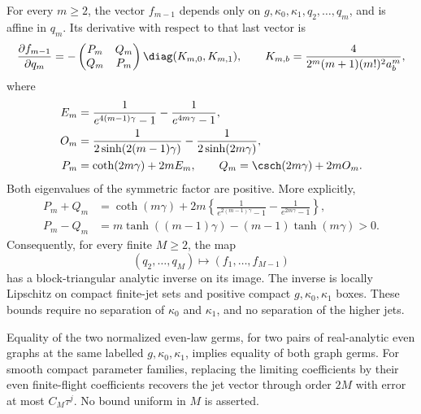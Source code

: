 \begin{theorem}
\label{thm:v12-two-contact}
For every $m\ge2$, the vector $f_{m-1}$ depends only on
$g,\kappa_0,\kappa_1,q_2,\ldots,q_m$, and is affine in $q_m$.
Its derivative with respect to that last vector is
\begin{equation}\label{eq:v12-block}
 \frac{\partial f_{m-1}}{\partial q_m}
 =-\begin{pmatrix}P_m&Q_m\\Q_m&P_m\end{pmatrix}
              \diag(K_{m,0},K_{m,1}),\qquad
 K_{m,b}=\frac{4}{2^m(m+1)(m!)^2a_b^m},
\end{equation}
where
\begin{align}
 E_m&=\frac1{e^{4(m-1)\gamma}-1}
                         -\frac1{e^{4m\gamma}-1},\notag\\
 O_m&=\frac1{2\sinh(2(m-1)\gamma)}
                         -\frac1{2\sinh(2m\gamma)},\notag\\
 P_m&=\coth(2m\gamma)+2mE_m,\qquad
 Q_m=\csch(2m\gamma)+2mO_m.\label{eq:v12-PQ}
\end{align}
Both eigenvalues of the symmetric factor are positive. More explicitly,
\begin{align}
 P_m+Q_m
 &=\coth(m\gamma)+2m\left\{
       \frac1{e^{2(m-1)\gamma}-1}-\frac1{e^{2m\gamma}-1}\right\},
                                      \label{eq:v12-plus}\\
 P_m-Q_m
 &=m\tanh((m-1)\gamma)-(m-1)\tanh(m\gamma)>0.
                                      \label{eq:v12-minus}
\end{align}
Consequently, for every finite $M\ge2$, the map
\begin{equation}\label{eq:v12-jet-map}
 (q_2,\ldots,q_M)\longmapsto(f_1,\ldots,f_{M-1})
\end{equation}
has a block-triangular analytic inverse on its image. The inverse is
locally Lipschitz on compact finite-jet sets and positive compact
$g,\kappa_0,\kappa_1$ boxes. These bounds require no separation of
$\kappa_0$ and $\kappa_1$, and no separation of the higher jets.

Equality of the two normalized even-law germs, for two pairs of
real-analytic even graphs at the same labelled $g,\kappa_0,\kappa_1$,
implies equality of both graph germs. For smooth compact parameter
families, replacing the limiting coefficients by their even finite-flight
coefficients recovers the jet vector through order $2M$ with error
at most $C_M\tau^j$. No bound uniform in $M$ is asserted.
\end{theorem}

